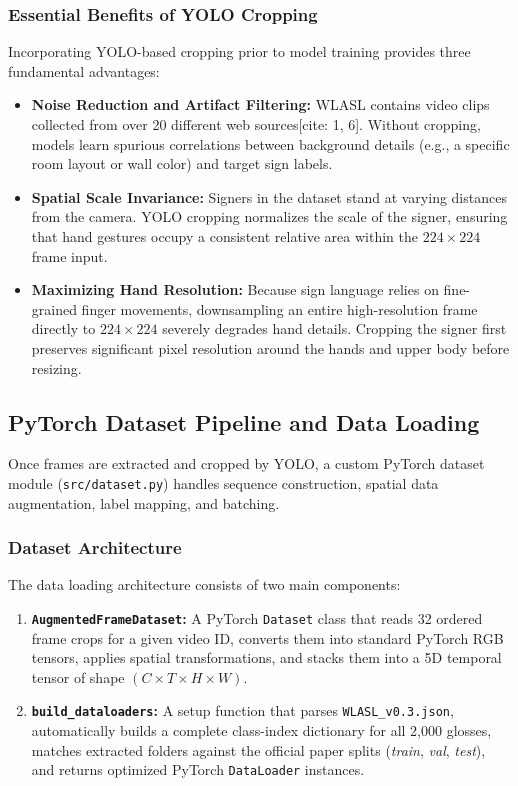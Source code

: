 \documentclass[12pt,a4paper]{article}
\begin{document}
\subsubsection{Essential Benefits of YOLO Cropping}
Incorporating YOLO-based cropping prior to model training provides three fundamental advantages:
\begin{itemize}
    \item \textbf{Noise Reduction and Artifact Filtering:} WLASL contains video clips collected from over 20 different web sources[cite: 1, 6]. Without cropping, models learn spurious correlations between background details (e.g., a specific room layout or wall color) and target sign labels.
    \item \textbf{Spatial Scale Invariance:} Signers in the dataset stand at varying distances from the camera. YOLO cropping normalizes the scale of the signer, ensuring that hand gestures occupy a consistent relative area within the $224 \times 224$ frame input.
    \item \textbf{Maximizing Hand Resolution:} Because sign language relies on fine-grained finger movements, downsampling an entire high-resolution frame directly to $224 \times 224$ severely degrades hand details. Cropping the signer first preserves significant pixel resolution around the hands and upper body before resizing.
\end{itemize}


\subsection{PyTorch Dataset Pipeline and Data Loading}

Once frames are extracted and cropped by YOLO, a custom PyTorch dataset module (\texttt{src/dataset.py}) handles sequence construction, spatial data augmentation, label mapping, and batching.

\subsubsection{Dataset Architecture}
The data loading architecture consists of two main components:
\begin{enumerate}
    \item \textbf{\texttt{AugmentedFrameDataset}:} A PyTorch \texttt{Dataset} class that reads 32 ordered frame crops for a given video ID, converts them into standard PyTorch RGB tensors, applies spatial transformations, and stacks them into a 5D temporal tensor of shape $(C \times T \times H \times W)$.
    \item \textbf{\texttt{build\_dataloaders}:} A setup function that parses \texttt{WLASL\_v0.3.json}, automatically builds a complete class-index dictionary for all 2,000 glosses, matches extracted folders against the official paper splits (\textit{train}, \textit{val}, \textit{test}), and returns optimized PyTorch \texttt{DataLoader} instances.
\end{enumerate}
\end{document}
